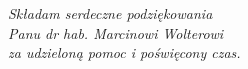 \begin{bottompar}

\begin{minipage}[t]{7cm}
\flushleft

\end{minipage}
\hfill
\begin{minipage}[t]{8cm}
\flushright
\noindent
\emph {Składam serdeczne podziękowania\\
Panu dr hab. Marcinowi Wolterowi\\
za udzieloną pomoc i poświęcony czas.}
\vspace{2cm}
\end{minipage}
\end{bottompar}

\linespread{1.3}
\selectfont